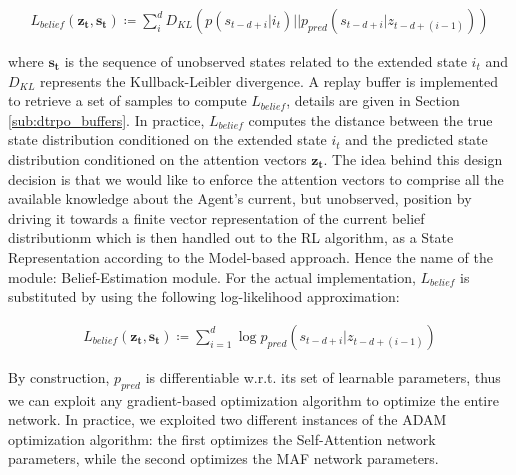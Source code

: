             \begin{align}
                L_{belief}(\mathbf{z_{t}}, \mathbf{s_t}) \coloneqq \sum_{i}^{d} D_{KL} \left( p(s_{t-d+i} \vert i_t) || p_{pred}(s_{t-d+i} \vert z_{t-d+(i-1)}) \right)
            \end{align}
            
            where $\mathbf{s_t}$ is the sequence of unobserved states related to the extended state $i_t$ and $D_{KL}$ represents the Kullback-Leibler divergence. A replay buffer is implemented to retrieve a set of samples to compute $L_{belief}$, details are given in Section \ref{sub:dtrpo_buffers}. In practice, $L_{belief}$ computes the distance between the true state distribution conditioned on the extended state $i_t$ and the predicted state distribution conditioned on the attention vectors $\mathbf{z_t}$. The idea behind this design decision is that we would like to enforce the attention vectors to comprise all the available knowledge about the Agent's current, but unobserved, position by driving it towards a finite vector representation of the current belief distributionm which is then handled out to the RL algorithm, as a State Representation according to the Model-based approach. Hence the name of the module: Belief-Estimation module. \newline
            For the actual implementation, $L_{belief}$ is substituted by using the following log-likelihood approximation:
            
            \begin{align}
                L_{belief}(\mathbf{z_t}, \mathbf{s_t}) \coloneqq \sum_{i=1}^{d} \log p_{pred} \left(s_{t-d+i} \vert z_{t-d+(i-1)} \right)
            \end{align}
            
            By construction, $p_{pred}$ is differentiable w.r.t. its set of learnable parameters, thus we can exploit any gradient-based optimization algorithm to optimize the entire network. In practice, we exploited two different instances of the ADAM optimization algorithm: the first optimizes the Self-Attention network parameters, while the second optimizes the MAF network parameters.
        
    \newpage
